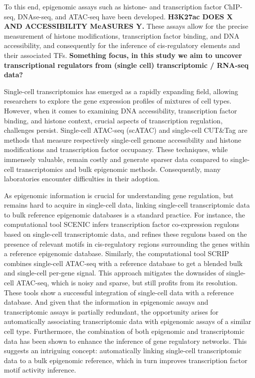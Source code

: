To this end, epigenomic assays such as histone- and transcription factor ChIP-seq\cite{Robertson_2007}, DNAse-seq\cite{Boyle_2008}, and ATAC-seq\cite{Buenrostro_2013} have been developed.  \textbf{H3K27ac DOES X AND ACCESSIBILITY MeASURES Y.} 
These assays allow for the precise measurement of histone modifications, transcription factor binding, and DNA accessibility, and consequently for the inference of cis-regulatory elements and their associated TFs. \textbf{Something focus, in this study we aim to uncover transcriptional regulators from (single cell) transcriptomic / RNA-seq data?}

Single-cell transcriptomics has emerged as a rapidly expanding field, allowing researchers to explore the gene expression profiles of mixtures of cell types. However, when it comes to examining DNA accessibility, transcription factor binding, and histone context, crucial aspects of transcription regulation, challenges persist. Single-cell ATAC-seq (scATAC)\cite{Buenrostro2015_sc} and single-cell CUT\&Tag\cite{Kaya_Okur_2019} are methods that measure respectively single-cell genome accessibility and histone modifications and transcription factor occupancy. These techniques, while immensely valuable, remain costly and generate sparser data compared to single-cell transcriptomics and bulk epigenomic methods\cite{Li2021}. Consequently, many laboratories encounter difficulties in their adoption.

As epigenomic information is crucial for understanding gene regulation, but remains hard to acquire in single-cell data, linking single-cell transcriptomic data to bulk reference epigenomic databases is a standard practice. For instance, the computational tool SCENIC infers transcription factor co-expression regulons based on single-cell transcriptomic data, and refines these regulons based on the presence of relevant motifs in cis-regulatory regions surrounding the genes within a reference epigenomic database\cite{Aibar_2017,VandeSande2020}. Similarly, the computational tool SCRIP combines single-cell ATAC-seq with a reference database to get a blended bulk and single-cell per-gene signal. This approach mitigates the downsides of single-cell ATAC-seq, which is noisy and sparse, but still profits from its resolution\cite{Dong2022}. These tools show a successful integration of single-cell data with a reference database. And given that the information in epigenomic assays and transcriptomic assays is partially redundant\cite{Wang2016,GonzlezRamrez2021}, the opportunity arises for automatically associating transcriptomic data with epigenomic assays of a similar cell type. Furthermore, the combination of both epigenomic and transcriptomic data has been shown to enhance the inference of gene regulatory networks\cite{Xu_2020,Kamal_2021}. This suggests an intriguing concept: automatically linking single-cell transcriptomic data to a bulk epigenomic reference, which in turn improves transcription factor motif activity inference.

